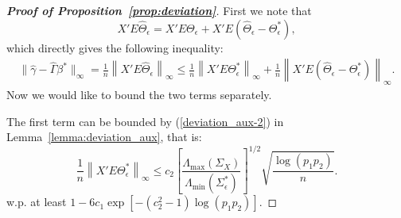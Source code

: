 \begin{proof}[\textbf{Proof of Proposition~\ref{prop:deviation}}] 
First we note that 
\begin{equation*}
X'E\widehat{\Theta}_\epsilon= X'E\Theta_\epsilon + X'E (\widehat{\Theta}_\epsilon -\Theta^*_\epsilon),
\end{equation*}
which directly gives the following inequality:
\begin{equation}\label{decomp}
\begin{split}
\|\widehat{\gamma}-\widehat{\Gamma}\beta^*\|_\infty=\frac{1}{n}\left\|X'E\widehat{\Theta}_\epsilon\right\|_\infty  \leq \frac{1}{n} \left\|X'E\Theta_\epsilon^*\right\|_\infty + \frac{1}{n}\left\|X'E (\widehat{\Theta}_\epsilon-\Theta_\epsilon^*)\right\|_\infty.
\end{split}
\end{equation}
Now we would like to bound the two terms separately. 

The first term can be bounded by (\ref{deviation_aux-2}) in Lemma~\ref{lemma:deviation_aux}, that is:
\begin{equation*}
\frac{1}{n}\left\| X'E\Theta_\epsilon^*\right\|_\infty \leq c_2\left[\frac{\Lambda_{\max}(\Sigma_X)}{\Lambda_{\min}(\Sigma^*_\epsilon)}\right]^{1/2} \sqrt{\frac{\log (p_1p_2)}{n}}.
\end{equation*}
w.p. at least $1-6c_1\exp[-(c_2^2-1)\log (p_1p_2)]$.


\end{proof}
